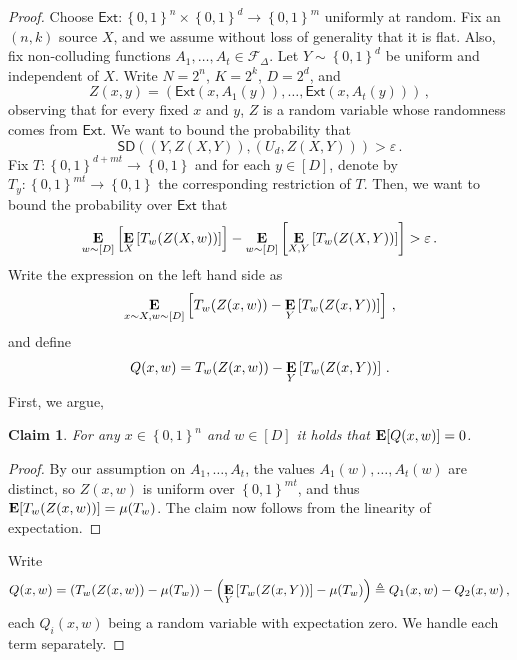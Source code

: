 \documentclass[11pt]{article}
\numberwithin{equation}{section}
\newtheorem{claim}[theorem]{Claim}
\theoremstyle{definition}
\theoremstyle{plain}
\newcommand{\ext}{\mathsf{Ext}}
\newcommand{\adv}{A}
\newcommand{\eps}{\varepsilon}
\newcommand{\set}[1]{\left\{{#1}\right\}}
\newcommand{\B}{\set{0,1}}
\newcommand{\E}{\mathop{\bf E\/}}
\newcommand{\advfampart}{\mathcal{F}}
\def\SD{\ensuremath{\mathsf{SD}}}
\begin{document}
\begin{proof}
Choose $\ext \colon \B^{n} \times \B^{d} \rightarrow \B^{m}$ uniformly at random.
Fix an $(n,k)$ source $X$, and we assume without loss of generality that it is flat. Also, fix non-colluding functions $\adv_1,\ldots,\adv_t \in \advfampart_{\Delta}$. Let $Y \sim \B^{d}$ be uniform and independent of $X$.
Write $N = 2^n$, $K = 2^k$, $D = 2^d$, and
\[
Z(x,y) = \left( \ext(x,\adv_1(y)),\ldots,\ext(x,\adv_t(y)) \right)\,,
\]
observing that for every fixed $x$ and $y$, $Z$ is a random variable whose
randomness comes from $\ext$. We want to bound the probability that
\[
\SD( (Y,Z(X,Y)),(U_d,Z(X,Y)) ) > \eps\,.
\]
Fix $T \colon \B^{d+mt}\rightarrow\B$ and for each $y \in [D]$, denote by
$T_y \colon \B^{mt} \rightarrow \B$ the corresponding restriction of $T$.
Then, we want to bound the probability over $\ext$ that
\[
\E_{w \sim [D]}\left[ \E_{X}\left[ T_{w}(Z(X,w)) \right] \right] - \E_{w \sim [D]}\left[ \E_{X,Y}\left[ T_{w}(Z(X,Y)) \right] \right] > \eps\,.
\]
Write the expression on the left hand side as
\[
\E_{x \sim X,w \sim [D]}\left[ T_{w}(Z(x,w)) - \E_{Y}\left[ T_{w}(Z(x,Y)) \right] \right]\,,
\]
and define
\[
Q(x,w) = T_{w}(Z(x,w)) - \E_{Y}\left[ T_{w}(Z(x,Y)) \right] \,.
\]
First, we argue,
\begin{claim}
For any $x \in \B^n$ and $w \in [D]$ it holds that $\E[Q(x,w)] = 0$.
\end{claim}
\begin{proof}
By our assumption on $\adv_1,\ldots,\adv_t$, the values $\adv_{1}(w),\ldots,\adv_{t}(w)$ 
are distinct, so $Z(x,w)$ is uniform over $\B^{mt}$, and thus $\E[T_{w}(Z(x,w))] = \mu(T_w)$.
The claim now follows from the linearity of expectation.
\end{proof}

Write
\[
Q(x,w) =\left( T_{w}(Z(x,w)) - \mu(T_w) \right) - \left( \E_{Y}\left[ T_{w}(Z(x,Y)) \right] - \mu(T_w) \right) 
\triangleq Q_{1}(x,w) - Q_{2}(x,w)\,,
\]
each $Q_{i}(x,w)$ being a random variable with expectation zero. We handle each term
separately.

%

\end{proof}
\end{document}

